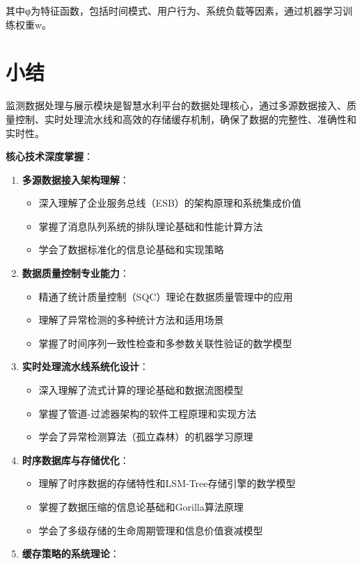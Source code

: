 其中φ为特征函数，包括时间模式、用户行为、系统负载等因素，通过机器学习训练权重w。

\section{小结}

监测数据处理与展示模块是智慧水利平台的数据处理核心，通过多源数据接入、质量控制、实时处理流水线和高效的存储缓存机制，确保了数据的完整性、准确性和实时性。

\textbf{核心技术深度掌握}：

\begin{enumerate}
\def\labelenumi{\arabic{enumi}.}
\tightlist
\item
  \textbf{多源数据接入架构理解}：

  \begin{itemize}
  \tightlist
  \item
    深入理解了企业服务总线（ESB）的架构原理和系统集成价值
  \item
    掌握了消息队列系统的排队理论基础和性能计算方法
  \item
    学会了数据标准化的信息论基础和实现策略
  \end{itemize}
\item
  \textbf{数据质量控制专业能力}：

  \begin{itemize}
  \tightlist
  \item
    精通了统计质量控制（SQC）理论在数据质量管理中的应用
  \item
    理解了异常检测的多种统计方法和适用场景
  \item
    掌握了时间序列一致性检查和多参数关联性验证的数学模型
  \end{itemize}
\item
  \textbf{实时处理流水线系统化设计}：

  \begin{itemize}
  \tightlist
  \item
    深入理解了流式计算的理论基础和数据流图模型
  \item
    掌握了管道-过滤器架构的软件工程原理和实现方法
  \item
    学会了异常检测算法（孤立森林）的机器学习原理
  \end{itemize}
\item
  \textbf{时序数据库与存储优化}：

  \begin{itemize}
  \tightlist
  \item
    理解了时序数据的存储特性和LSM-Tree存储引擎的数学模型
  \item
    掌握了数据压缩的信息论基础和Gorilla算法原理
  \item
    学会了多级存储的生命周期管理和信息价值衰减模型
  \end{itemize}
\item
  \textbf{缓存策略的系统理论}：


\end{enumerate}
